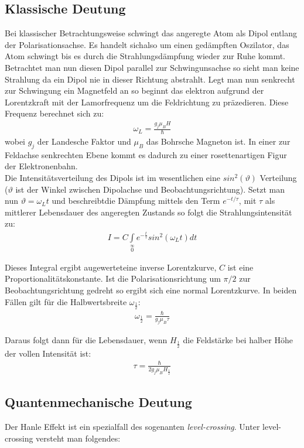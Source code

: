 \documentclass[12pt]{article}
\begin{document}
\subsection{Klassische Deutung}
Bei klassischer Betrachtungsweise schwingt das angeregte Atom als Dipol entlang der Polarisationsachse. Es handelt sichalso um einen gedämpften Oszilator, das Atom schwingt bis es durch die Strahlungsdämpfung wieder zur Ruhe kommt. Betrachtet man nun diesen Dipol parallel zur Schwingunsachse so sieht man keine Strahlung da ein Dipol nie in dieser Richtung abstrahlt. Legt man nun senkrecht zur Schwingung ein Magnetfeld an so beginnt das elektron aufgrund der Lorentzkraft mit der Lamorfrequenz um die Feldrichtung zu präzedieren. Diese Frequenz berechnet sich zu:
\begin{align}
 \omega_L=\frac{g_j \mu_B H}{\hbar}
\end{align}
wobei $g_j$ der Landesche Faktor und $\mu_B$ das Bohrsche Magneton ist. In einer zur Feldachse senkrechten Ebene kommt es dadurch zu einer rosettenartigen Figur der Elektronenbahn.
\\
Die Intensitätsverteilung des Dipols ist im wesentlichen eine $sin^2(\vartheta)$ Verteilung ($\vartheta$ ist der
Winkel zwischen Dipolachse und Beobachtungsrichtung). Setzt man nun $\vartheta = \omega_L t$ und beschreibtdie Dämpfung mittels den Term $e^{-t/\tau}$, mit $\tau$ als mittlerer Lebensdauer des angeregten Zustands so folgt die Strahlungsintensität zu:
\begin{align}
 I = C \int \limits_{0} \limits^{\infty} e^{-\frac{t}{\tau}}sin^2(\omega_L t) dt
\end{align}

Dieses Integral ergibt augewerteteine inverse Lorentzkurve, $C$ ist eine Proportionalitätskonstante. Ist die Polarisationsrichtung um $\pi/2$ zur Beobachtungsrichtung gedreht so ergibt sich eine normal Lorentzkurve. In beiden Fällen gilt für die Halbwertsbreite $\omega_{\frac{1}{2}}$:
\begin{align}
 \omega_{\frac{1}{2}}= \frac{\hbar}{g_j \mu_B\tau}
\end{align}

Daraus folgt dann für die Lebensdauer, wenn $H_{\frac{1}{2}}$ die Feldstärke bei halber Höhe der vollen Intensität ist:
\begin{align}
 \label{livetime_classic} \tau = \frac{\hbar}{2 g_j \mu_B H_{\frac{1}{2}}}
\end{align}

\subsection{Quantenmechanische Deutung}
Der Hanle Effekt ist ein spezialfall des sogenanten \textit{level-crossing}. Unter level-crossing versteht man folgendes:
\end{document}
